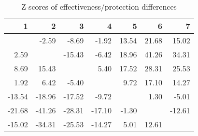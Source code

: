 \begin{table}[ht]
\centering
\begin{tabular}{rrrrrrr}
  \hline
1 & 2 & 3 & 4 & 5 & 6 & 7 \\ 
  \hline
 & -2.59 & -8.69 & -1.92 & 13.54 & 21.68 & 15.02 \\ 
  2.59 &  & -15.43 & -6.42 & 18.96 & 41.26 & 34.31 \\ 
  8.69 & 15.43 &  & 5.40 & 17.52 & 28.31 & 25.53 \\ 
  1.92 & 6.42 & -5.40 &  & 9.72 & 17.10 & 14.27 \\ 
  -13.54 & -18.96 & -17.52 & -9.72 &  & 1.30 & -5.01 \\ 
  -21.68 & -41.26 & -28.31 & -17.10 & -1.30 &  & -12.61 \\ 
  -15.02 & -34.31 & -25.53 & -14.27 & 5.01 & 12.61 &  \\ 
   \hline
\end{tabular}
\caption{Z-scores of effectiveness/protection differences} 
\end{table}
